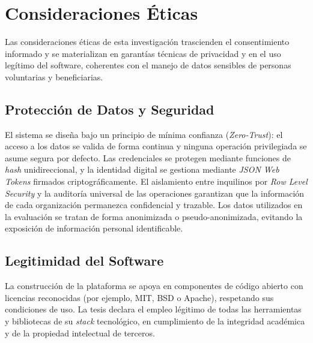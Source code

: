 \section{Consideraciones \'Eticas}

Las consideraciones \'eticas de esta investigaci\'on trascienden el consentimiento
informado y se materializan en garant\'ias t\'ecnicas de privacidad y en el uso
leg\'itimo del software, coherentes con el manejo de datos sensibles de personas
voluntarias y beneficiarias.

\subsection{Protecci\'on de Datos y Seguridad}

El sistema se dise\~na bajo un principio de m\'inima confianza (\textit{Zero-Trust}):
el acceso a los datos se valida de forma continua y ninguna operaci\'on privilegiada
se asume segura por defecto. Las credenciales se protegen mediante funciones de
\textit{hash} unidireccional, y la identidad digital se gestiona mediante
\textit{JSON Web Tokens} firmados criptogr\'aficamente. El aislamiento entre
inquilinos por \textit{Row Level Security} y la auditor\'ia universal de las
operaciones garantizan que la informaci\'on de cada organizaci\'on permanezca
confidencial y trazable. Los datos utilizados en la evaluaci\'on se tratan de forma
anonimizada o pseudo-anonimizada, evitando la exposici\'on de informaci\'on
personal identificable.

\subsection{Legitimidad del Software}

La construcci\'on de la plataforma se apoya en componentes de c\'odigo abierto con
licencias reconocidas (por ejemplo, MIT, BSD o Apache), respetando sus condiciones
de uso. La tesis declara el empleo l\'egitimo de todas las herramientas y
bibliotecas de su \textit{stack} tecnol\'ogico, en cumplimiento de la integridad
acad\'emica y de la propiedad intelectual de terceros.
